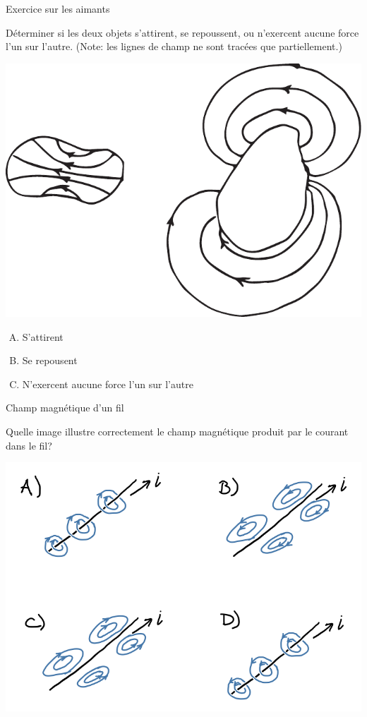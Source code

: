 \documentclass{beamer}
\begin{document}
\begin{frame}[t]{Exercice sur les aimants}

  Déterminer si les deux objets s'attirent, se repoussent, ou n'exercent aucune
  force l'un sur l'autre. (Note: les lignes de champ ne sont tracées que
  partiellement.)

  \begin{center}
    \includegraphics[scale=0.6]{figures/exercice-champ-magnetique1c.pdf}
  \end{center}

  \begin{enumerate}[A.]
    \item S'attirent
    \item Se repousent
    \item N'exercent aucune force l'un sur l'autre
  \end{enumerate}

\end{frame}


\begin{frame}[t]{Champ magnétique d'un fil}
  
  Quelle image illustre correctement le champ magnétique produit par le courant
  dans le fil?

  \begin{center}
    \includegraphics[scale=0.5]{figures/champ_fil_ex1.png}
  \end{center}

\end{frame}
\end{document}
